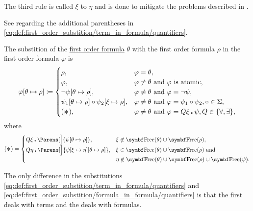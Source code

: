 \begin{definition}
\begin{DefEnum}
    The third rule is called  \( \xi \) to \( \eta \) and is done to mitigate the problems described in .

    See  regarding the additional parentheses in \eqref{eq:def:first_order_substition/term_in_formula/quantifiers}.

     The substition of the \hyperref[def:first_order_language/formula]{first order formula} \( \theta \) with the first order formula \( \rho \) in the first order formula \( \varphi \) is
    \begin{equation}\label{eq:def:first_order_substition/formula_in_formula}
      \varphi[\theta \mapsto \rho] \coloneqq \begin{cases}
        \rho,                                                                          &\varphi = \theta, \\
        \varphi,                                                                       &\varphi \neq \theta \T{and} \varphi \text{ is atomic}, \\
        \neg \psi[\theta \mapsto \rho],                                                &\varphi \neq \theta \T{and} \varphi = \neg \psi, \\
        \psi_1[\theta \mapsto \rho] \circ \psi_2[\xi \mapsto \rho],                    &\varphi \neq \theta \T{and} \varphi = \psi_1 \circ \psi_2, \circ \in \Sigma, \\
        (\Ast),                                                                        &\varphi \neq \theta \T{and} \varphi = Q \xi \centerdot \psi, Q \in \{ \forall, \exists \},
      \end{cases}
    \end{equation}
    where
    \begin{equation}\label{eq:def:first_order_substition/formula_in_formula/quantifiers}
      (\Ast) = \begin{cases}
        Q \xi \centerdot \Parens[\Big]{\psi[\theta \mapsto \rho]},                     &\xi \not\in \Bold{Free}(\theta) \cup \Bold{Free}(\rho), \\
        Q \eta \centerdot \Parens[\Big]{\psi[\xi \mapsto \eta][\theta \mapsto \rho]},  &\xi \in \Bold{Free}(\theta) \cup \Bold{Free}(\rho) \T{and} \\
                                                                                       &\eta \not\in \Bold{Free}(\theta) \cup \Bold{Free}(\rho) \cup \Bold{Free}(\psi).
      \end{cases}
    \end{equation}

    The only difference in the substitutions \eqref{eq:def:first_order_substition/term_in_formula/quantifiers} and \eqref{eq:def:first_order_substition/formula_in_formula/quantifiers} is that the first deals with terms and the deals with formulas.
  \end{DefEnum}
\end{definition}

